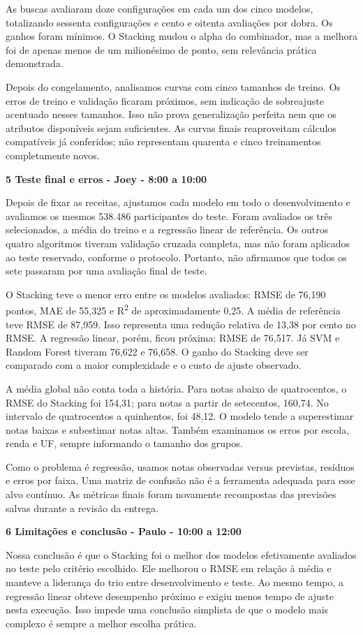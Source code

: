 \documentclass[12pt,a4paper]{article}
\newcommand{\heading}[1]{\par\Needspace{4\baselineskip}\noindent\textbf{#1}\par\vspace{5pt}}
\begin{document}
As buscas avaliaram doze configurações em cada um dos cinco modelos, totalizando sessenta configurações e cento e oitenta avaliações por dobra. Os ganhos foram mínimos. O Stacking mudou o alpha do combinador, mas a melhora foi de apenas menos de um milionésimo de ponto, sem relevância prática demonstrada.


Depois do congelamento, analisamos curvas com cinco tamanhos de treino. Os erros de treino e validação ficaram próximos, sem indicação de sobreajuste acentuado nesses tamanhos. Isso não prova generalização perfeita nem que os atributos disponíveis sejam suficientes. As curvas finais reaproveitam cálculos compatíveis já conferidos; não representam quarenta e cinco treinamentos completamente novos.


\heading{5 Teste final e erros - Joey - 8:00 a 10:00}
Depois de fixar as receitas, ajustamos cada modelo em todo o desenvolvimento e avaliamos os mesmos 538.486 participantes do teste. Foram avaliados os três selecionados, a média do treino e a regressão linear de referência. Os outros quatro algoritmos tiveram validação cruzada completa, mas não foram aplicados ao teste reservado, conforme o protocolo. Portanto, não afirmamos que todos os sete passaram por uma avaliação final de teste.


O Stacking teve o menor erro entre os modelos avaliados: RMSE de 76,190 pontos, MAE de 55,325 e R\textsuperscript{2} de aproximadamente 0,25. A média de referência teve RMSE de 87,959. Isso representa uma redução relativa de 13,38 por cento no RMSE. A regressão linear, porém, ficou próxima: RMSE de 76,517. Já SVM e Random Forest tiveram 76,622 e 76,658. O ganho do Stacking deve ser comparado com a maior complexidade e o custo de ajuste observado.


A média global não conta toda a história. Para notas abaixo de quatrocentos, o RMSE do Stacking foi 154,31; para notas a partir de setecentos, 160,74. No intervalo de quatrocentos a quinhentos, foi 48,12. O modelo tende a superestimar notas baixas e subestimar notas altas. Também examinamos os erros por escola, renda e UF, sempre informando o tamanho dos grupos.


Como o problema é regressão, usamos notas observadas versus previstas, resíduos e erros por faixa. Uma matriz de confusão não é a ferramenta adequada para esse alvo contínuo. As métricas finais foram novamente recompostas das previsões salvas durante a revisão da entrega.


\heading{6 Limitações e conclusão - Paulo - 10:00 a 12:00}
Nossa conclusão é que o Stacking foi o melhor dos modelos efetivamente avaliados no teste pelo critério escolhido. Ele melhorou o RMSE em relação à média e manteve a liderança do trio entre desenvolvimento e teste. Ao mesmo tempo, a regressão linear obteve desempenho próximo e exigiu menos tempo de ajuste nesta execução. Isso impede uma conclusão simplista de que o modelo mais complexo é sempre a melhor escolha prática.
\end{document}
